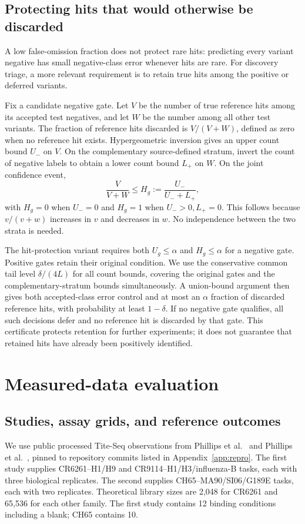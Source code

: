 \documentclass[11pt,letterpaper]{article}
\begin{document}
\subsection{Protecting hits that would otherwise be discarded}
A low false-omission fraction does not protect rare hits: predicting every variant negative has small negative-class error whenever hits are rare. For discovery triage, a more relevant requirement is to retain true hits among the positive or deferred variants.

Fix a candidate negative gate. Let $V$ be the number of true reference hits among its accepted test negatives, and let $W$ be the number among all other test variants. The fraction of reference hits discarded is $V/(V+W)$, defined as zero when no reference hit exists. Hypergeometric inversion gives an upper count bound $U_-$ on $V$. On the complementary source-defined stratum, invert the count of negative labels to obtain a lower count bound $L_+$ on $W$. On the joint confidence event,
\begin{equation}
 \frac{V}{V+W}\leq H_g:=\frac{U_-}{U_-+L_+},
 \label{eq:protect}
\end{equation}
with $H_g=0$ when $U_-=0$ and $H_g=1$ when $U_->0,L_+=0$. This follows because $v/(v+w)$ increases in $v$ and decreases in $w$. No independence between the two strata is needed.

The hit-protection variant requires both $U_g\leq\alpha$ and $H_g\leq\alpha$ for a negative gate. Positive gates retain their original condition. We use the conservative common tail level $\delta/(4L)$ for all count bounds, covering the original gates and the complementary-stratum bounds simultaneously. A union-bound argument then gives both accepted-class error control and at most an $\alpha$ fraction of discarded reference hits, with probability at least $1-\delta$. If no negative gate qualifies, all such decisions defer and no reference hit is discarded by that gate. This certificate protects retention for further experiments; it does not guarantee that retained hits have already been positively identified.

\section{Measured-data evaluation}
\subsection{Studies, assay grids, and reference outcomes}
We use public processed Tite-Seq observations from Phillips et al.~\citep{phillips2021} and Phillips et al.~\citep{phillips2023}, pinned to repository commits listed in Appendix~\ref{app:repro}. The first study supplies CR6261--H1/H9 and CR9114--H1/H3/influenza-B tasks, each with three biological replicates. The second supplies CH65--MA90/SI06/G189E tasks, each with two replicates. Theoretical library sizes are 2,048 for CR6261 and 65,536 for each other family. The first study contains 12 binding conditions including a blank; CH65 contains 10.
\end{document}
